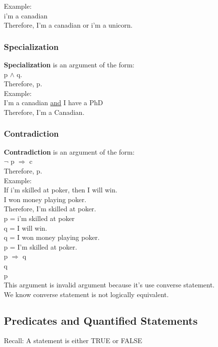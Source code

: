\documentclass[11pt]{article}
\begin{document}
Example:\\
i'm a canadian\\
Therefore, I'm a canadian or i'm a unicorn.\\


\subsubsection{Specialization}
\label{sec:orgfbfdb8e}
\textbf{Specialization} is an argument of the form:\\
p \(\land\) q.\\
Therefore, p.\\

Example:\\
I'm a canadian \uline{and} I have a PhD\\
Therefore, I'm a Canadian.\\


\subsubsection{Contradiction}
\label{sec:org02a4026}
\textbf{Contradiction} is an argument of the form:\\
\(\neg{}\) p \(\Rightarrow\) c\\
Therefore, p.\\

Example:\\
If i'm skilled at poker, then I will win.\\
I won money playing poker.\\
Therefore, I'm skilled at poker.\\

p = i'm skilled at poker\\
q = I will win.\\
q = I won money playing poker.\\
p = I'm skilled at poker.\\

p \(\Rightarrow\) q\\
q\\
p\\

This argument is invalid argument because it's use converse statement.\\
We know converse statement is not logically equivalent.\\


\subsection{Predicates and Quantified Statements}
\label{sec:orgefdce1e}
Recall: A statement is either TRUE or FALSE\\
\end{document}

